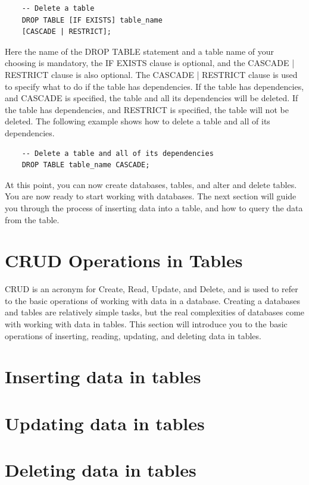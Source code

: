 \begin{verbatim}
    -- Delete a table
    DROP TABLE [IF EXISTS] table_name 
    [CASCADE | RESTRICT];
\end{verbatim}

Here the name of the DROP TABLE statement and a table name of your choosing is mandatory, the IF EXISTS clause is optional, and the CASCADE | RESTRICT clause is also optional. The CASCADE | RESTRICT clause is used to specify what to do if the table has dependencies. If the table has dependencies, and CASCADE is specified, the table and all its dependencies will be deleted. If the table has dependencies, and RESTRICT is specified, the table will not be deleted. The following example shows how to delete a table and all of its dependencies.

\begin{verbatim}
    -- Delete a table and all of its dependencies
    DROP TABLE table_name CASCADE;
\end{verbatim}

At this point, you can now create databases, tables, and alter and delete tables. You are now ready to start working with databases. The next section will guide you through the process of inserting data into a table, and how to query the data from the table.

\section{CRUD Operations in Tables}
CRUD is an acronym for Create, Read, Update, and Delete, and is used to refer to the basic operations of working with data in a database. Creating a databases and tables are relatively simple tasks, but the real complexities of databases come with working with data in tables. This section will introduce you to the basic operations of inserting, reading, updating, and deleting data in tables. 

\section{Inserting data in tables}
\section{Updating data in tables}
\section{Deleting data in tables}
